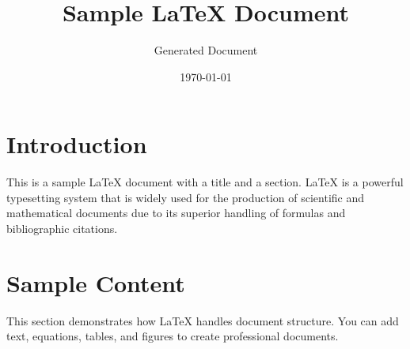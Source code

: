 \documentclass{article}
\title{Sample LaTeX Document}
\author{Generated Document}
\date{\today}
\begin{document}
\maketitle

\section{Introduction}
This is a sample LaTeX document with a title and a section. LaTeX is a powerful typesetting system that is widely used for the production of scientific and mathematical documents due to its superior handling of formulas and bibliographic citations.

\section{Sample Content}
This section demonstrates how LaTeX handles document structure. You can add text, equations, tables, and figures to create professional documents.
\end{document}
